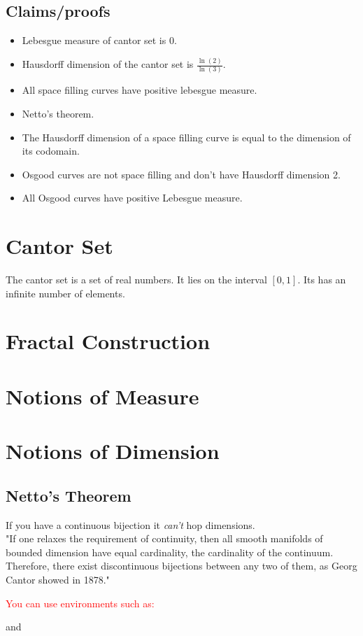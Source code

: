 \documentclass[11pt]{ekblite}
\newcommand\aaron[1]{\textcolor{red}{#1}}
\begin{document}
		\subsection{Claims/proofs}
		\begin{itemize}
			\item Lebesgue measure of cantor set is 0.
			\item Hausdorff dimension of the cantor set is $\frac{\ln (2)}{\ln (3)}$.
			\item All space filling curves have positive lebesgue measure.
			\item Netto's theorem.
			\item The Hausdorff dimension of a space filling curve is equal to the dimension of its codomain.
			\item Osgood curves are not space filling and don't have Hausdorff dimension 2.
			\item All Osgood curves have positive Lebesgue measure.
		\end{itemize}
	\newpage
	\section{Cantor Set}
	The cantor set is a set of real numbers. It lies on the interval $[0,1]$. Its has an infinite number of elements. 
	\newpage
	\section{Fractal Construction}
    \section{Notions of Measure}
    \section{Notions of Dimension}
	\subsection{Netto's Theorem}
	If you have a continuous bijection it \textit{can't} hop dimensions.
	\\[0.2in]
    "If one relaxes the requirement of continuity, then all smooth manifolds of bounded dimension have equal cardinality, the cardinality of the continuum. Therefore, there exist discontinuous bijections between any two of them, as Georg Cantor showed in 1878."

\aaron{You can use environments such as:}
    \begin{theorem}
        
    \end{theorem}
    and 
    \begin{definition}
        
    \end{definition}


	


\end{document}

